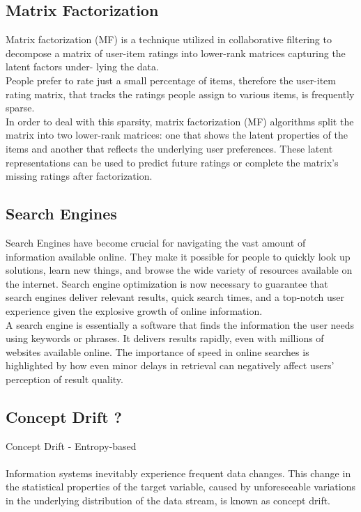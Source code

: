 \documentclass[10pt,oneside,english,a4paper]{article}
\begin{document}
\subsection{Matrix Factorization}
Matrix factorization (MF) is a technique utilized in collaborative filtering to decompose
a matrix of user-item ratings into lower-rank matrices capturing the latent factors under-
lying the data\cite{Tokala2023}.\\
People prefer to rate just a small percentage of items, therefore the user-item rating matrix, that tracks the ratings people assign to various items, is frequently sparse.\\
In order to deal with this sparsity, matrix factorization (MF) algorithms split the matrix into two lower-rank matrices: one that shows the latent properties of the items and another that reflects the underlying user preferences. These latent representations can be used to predict future ratings or complete the matrix's missing ratings after factorization.

\subsection{Search Engines}
Search Engines have become crucial for navigating the vast amount of information available online. They make it possible for people to quickly look up solutions, learn new things, and browse the wide variety of resources available on the internet. Search engine optimization is now necessary to guarantee that search engines deliver relevant results, quick search times, and a top-notch user experience given the explosive growth of online information.\\
A search engine is essentially a software that finds the information the user needs using keywords or phrases. It delivers results rapidly, even with millions of websites available online.
The importance of speed in online searches is highlighted by how even minor delays in retrieval can negatively affect users' perception of result quality.
\cite{pub.1171882357}

\clearpage
\subsection{Concept Drift ?}
Concept Drift - Entropy-based\\\\
Information systems inevitably experience frequent data changes. 
This change in the statistical properties of the target variable, caused by
unforeseeable variations in the underlying distribution of the data
stream, is known as concept drift.\cite{Sun2024}
\end{document}

